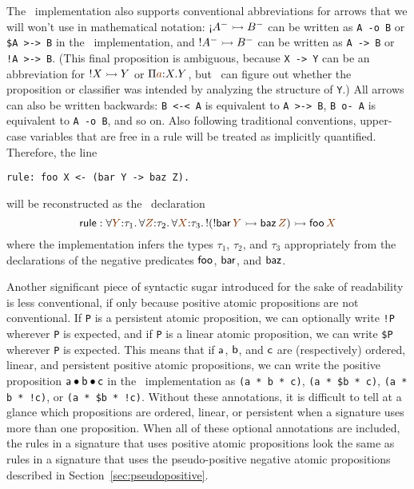 The \sls~implementation also supports conventional abbreviations for
arrows that we will won't use in mathematical notation: ${\gnab}A^-
\lefti B^-$ can be written as \verb|A -o B| or \verb|$A >-> B| in the
\sls~implementation, and ${!}A^- \rightarrowtail B^-$ can be written as
\verb|A -> B| or \verb|!A >-> B|.  (This final proposition is
ambiguous, because \verb|X -> Y| can be an abbreviation for ${!}X
\rightarrowtail Y$ or $\Pi \lf{a}{:}X. Y$, but \sls~can figure out whether the
proposition or classifier was intended by analyzing the structure of
\verb|Y|.)  All arrows can also be written backwards: \verb|B <-< A|
is equivalent to \verb|A >-> B|, \verb|B o- A| is equivalent to
\verb|A -o B|, and so on. Also following traditional conventions,
upper-case variables that are free in a rule will be treated as
implicitly quantified. Therefore, the line
\bigskip
\begin{verbatim}
rule: foo X <- (bar Y -> baz Z).
\end{verbatim}
\bigskip
will be reconstructed as the \sls~declaration 
\[{\sf rule} : \forall\lf{Y}{:}\tau_1.\,\forall\lf{Z}{:}\tau_2.\,\forall\lf{X}{:}\tau_3.\,{!}({!}{\sf bar}\,\lf{Y} \lefti {\sf baz}\,\lf{Z}) \lefti {\sf foo}\,\lf{X}\] 
%
where the implementation infers the types $\tau_1$, $\tau_2$, and
$\tau_3$ appropriately from the declarations of the negative
predicates ${\sf foo}$, ${\sf bar}$, and ${\sf baz}$.

Another significant piece of syntactic sugar introduced for 
the sake of readability is less conventional, if only because
positive atomic propositions are not conventional. If \verb|P| is a
persistent atomic proposition, we can optionally write \verb|!P|
wherever \verb|P| is expected, and if \verb|P| is a linear atomic
proposition, we can write \verb|$P| wherever \verb|P| is
expected. This means that if ${\sf a}$, ${\sf b}$, and ${\sf c}$ are
(respectively) ordered, linear, and persistent positive atomic
propositions, we can write the positive proposition ${\sf a} \mathbin{\bullet}
{\sf b} \mathbin{\bullet} {\sf c}$ in the \sls~implementation as
\verb|(a * b * c)|, \verb|(a * $b * c)|, \verb|(a * b * !c)|, or
\verb|(a * $b * !c)|. Without these annotations, it is difficult to
tell at a glance which propositions are ordered, linear, or persistent
when a signature uses more than one proposition. When all of these
optional annotations are included, the rules in a signature that uses
positive atomic propositions look the same as rules in a signature
that uses the pseudo-positive negative atomic propositions described
in Section~\ref{sec:pseudopositive}. 


